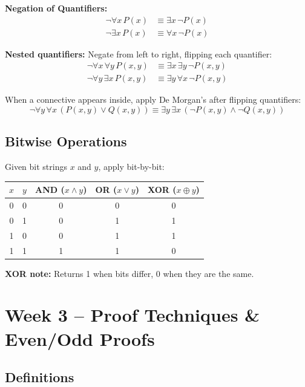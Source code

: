 \documentclass{article}
\newcommand{\sectionbreak}{\clearpage}
\begin{document}
\medbreak
\textbf{Negation of Quantifiers:}
\begin{align*}
    \neg \forall x\, P(x) &\equiv \exists x\, \neg P(x) \\
    \neg \exists x\, P(x) &\equiv \forall x\, \neg P(x)
\end{align*}

\textbf{Nested quantifiers:} Negate from left to right, flipping each quantifier:
\begin{align*}
    \neg \forall x\, \forall y\, P(x,y) &\equiv \exists x\, \exists y\, \neg P(x,y) \\
    \neg \forall y\, \exists x\, P(x,y) &\equiv \exists y\, \forall x\, \neg P(x,y)
\end{align*}

When a connective appears inside, apply De Morgan's after flipping quantifiers:
\[\neg \forall y\, \forall x\, (P(x,y) \lor Q(x,y)) \equiv \exists y\, \exists x\, (\neg P(x,y) \land \neg Q(x,y))\]

\subsection*{Bitwise Operations}

Given bit strings $x$ and $y$, apply bit-by-bit:

\medbreak

\begin{tabular}{|c|c|c|c|c|}
\hline
$x$ & $y$ & AND ($x \land y$) & OR ($x \lor y$) & XOR ($x \oplus y$) \\
\hline
0 & 0 & 0 & 0 & 0 \\
0 & 1 & 0 & 1 & 1 \\
1 & 0 & 0 & 1 & 1 \\
1 & 1 & 1 & 1 & 0 \\
\hline
\end{tabular}

\medbreak
\textbf{XOR note:} Returns 1 when bits differ, 0 when they are the same.


\sectionbreak
\section*{Week 3 -- Proof Techniques \& Even/Odd Proofs}

\subsection*{Definitions}
\end{document}
